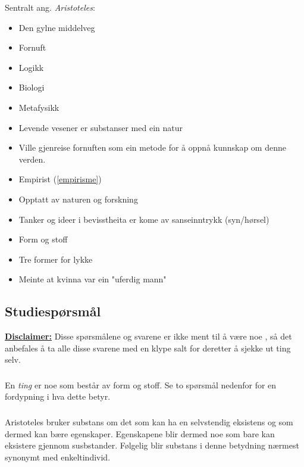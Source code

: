 \documentclass[a4paper]{IEEEtran}
\begin{document}
\begin{center}
Sentralt ang. \textit{Aristoteles}:
\end{center}
\begin{itemize}\bigskip
    \item Den gylne middelveg
    \item Fornuft
    \item Logikk
    \item Biologi
    \item Metafysikk
    \item Levende vesener er substanser med ein natur
    \item Ville gjenreise fornuften som ein metode for å oppnå kunnskap om denne verden.
    \item Empirist (\ref{empirisme})
    \item Opptatt av naturen og forskning
    \item Tanker og ideer i bevisstheita er kome av sanseinntrykk (syn/hørsel)
    \item Form og stoff 
    \item Tre former for lykke
    \item Meinte at kvinna var ein "uferdig mann"
    
\end{itemize}\bigskip

 \subsection{Studiespørsmål}
     \underline{\textbf{Disclaimer:}} Disse spørsmålene og svarene er ikke ment til
     å være noe , så det anbefales å ta 
     alle disse svarene med en klype salt for deretter å sjekke ut ting selv.

        \subsubsection{}
        En \textit{ting} er noe som består av form og stoff. Se to spørsmål 
        nedenfor for en fordypning i hva dette betyr. \medskip

        \subsubsection{}
        Aristoteles bruker substans om det som kan ha en selvstendig 
        eksistens og som dermed kan bære egenskaper. Egenskapene blir dermed 
        noe som bare kan eksistere gjennom susbstander. Følgelig blir 
        substans i denne betydning nærmest synonymt med enkeltindivid. 
        \cite{snl_substans} \medskip
\end{document}
